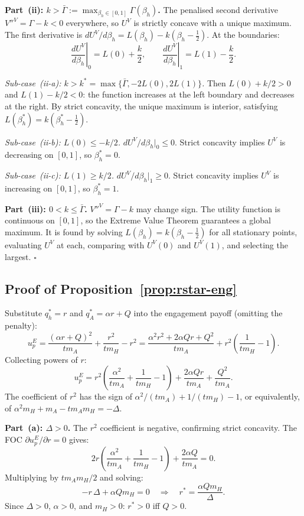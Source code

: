 \documentclass[mnsc,nonblindrev]{informs3_NoOR}
\begin{document}
 
\medskip\noindent\textbf{Part~(ii): $k > \bar\Gamma  := \max_{\beta_h \in [0,1]} \Gamma(\beta_h)$.}
The penalised second derivative $V''^V = \Gamma - k < 0$ everywhere, so $U^V$ is strictly concave with a unique maximum. The first derivative is $dU^V/d\beta_h = L(\beta_h) - k(\beta_h - \frac{1}{2})$. At the boundaries:
\[
\left.\frac{dU^V}{d\beta_h}\right|_0 = L(0) + \frac{k}{2}, \qquad \left.\frac{dU^V}{d\beta_h}\right|_1 = L(1) - \frac{k}{2}.
\]
 
\emph{Sub-case~(ii-a): $k > k^* = \max\{\bar\Gamma, -2L(0), 2L(1)\}$.}
Then $L(0) + k/2 > 0$ and $L(1) - k/2 < 0$: the function increases at the left boundary and decreases at the right. By strict concavity, the unique maximum is interior, satisfying $L(\beta_h^*) = k(\beta_h^* - \frac{1}{2})$.
 
\emph{Sub-case~(ii-b): $L(0) \leq -k/2$.}
$dU^V/d\beta_h|_0 \leq 0$. Strict concavity implies $U^V$ is decreasing on $[0,1]$, so $\beta_h^* = 0$.
 
\emph{Sub-case~(ii-c): $L(1) \geq k/2$.}
$dU^V/d\beta_h|_1 \geq 0$. Strict concavity implies $U^V$ is increasing on $[0,1]$, so $\beta_h^* = 1$.
 
\medskip\noindent\textbf{Part~(iii): $0 < k \leq \bar\Gamma$.}
$V''^V = \Gamma - k$ may change sign. The utility function is continuous on $[0,1]$, so the Extreme Value Theorem guarantees a global maximum. It is found by solving $L(\beta_h) = k(\beta_h - \frac{1}{2})$ for all stationary points, evaluating $U^V$ at each, comparing with $U^V(0)$ and $U^V(1)$, and selecting the largest. \hfill$\square$
 
\subsection*{Proof of Proposition~\ref{prop:rstar-eng}}
 
Substitute $q_h^* = r$ and $q_A^* = \alpha r + Q$ into the engagement payoff (omitting the penalty):
\[
u_p^E = \frac{(\alpha r + Q)^2}{tm_A} + \frac{r^2}{tm_H} - r^2 = \frac{\alpha^2 r^2 + 2\alpha Qr + Q^2}{tm_A} + r^2\!\left(\frac{1}{tm_H} - 1\right).
\]
Collecting powers of $r$:
\[
u_p^E = r^2\!\left(\frac{\alpha^2}{tm_A} + \frac{1}{tm_H} - 1\right) + \frac{2\alpha Qr}{tm_A} + \frac{Q^2}{tm_A}.
\]
The coefficient of $r^2$ has the sign of $\alpha^2/(tm_A) + 1/(tm_H) - 1$, or equivalently, of $\alpha^2 m_H + m_A - tm_Am_H = -\Delta$.
 
\medskip\noindent\textbf{Part~(a): $\Delta > 0$.}
The $r^2$ coefficient is negative, confirming strict concavity. The FOC $\partial u_p^E/\partial r = 0$ gives:
\[
2r\!\left(\frac{\alpha^2}{tm_A} + \frac{1}{tm_H} - 1\right) + \frac{2\alpha Q}{tm_A} = 0.
\]
Multiplying by $tm_Am_H/2$ and solving:
\[
-r\,\Delta + \alpha Qm_H = 0 \quad\Longrightarrow\quad r^* = \frac{\alpha Qm_H}{\Delta}.
\]
Since $\Delta > 0$, $\alpha > 0$, and $m_H > 0$: $r^* > 0$ iff $Q > 0$.
 
\end{document}

